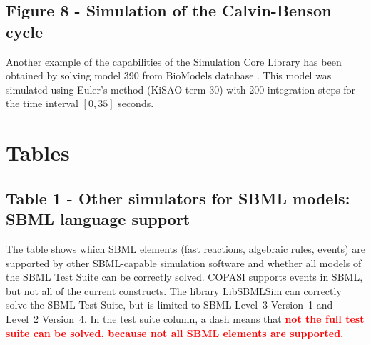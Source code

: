 \documentclass[10pt]{bmc_article}
\newenvironment{bmcformat}{\baselineskip20pt\sloppy\setboolean{publ}{false}}{\baselineskip20pt\sloppy}
\newcommand{\TODO}[1]{\textcolor{red}{\textbf{#1}}}
\begin{document}
\begin{bmcformat}
\subsection*{Figure 8 - Simulation of the Calvin-Benson cycle}
Another example of the capabilities of the Simulation Core Library has been obtained by solving model 390 from BioModels database \cite{Novere2006a, Arnold2011}.
This model was simulated using Euler's method (KiSAO term 30) with 200 integration steps for the time interval $[0, 35]$ seconds.



\section*{Tables}

\subsection*{Table 1 - Other simulators for SBML models: SBML language support}
The table shows which SBML elements (fast reactions, algebraic rules, events) 
are supported by other SBML-capable simulation software and whether all models
of the SBML Test Suite can be correctly solved.
COPASI supports events in SBML, but not all of the current constructs.
The library LibSBMLSim can correctly solve the SBML Test Suite, but is limited
to SBML Level~3 Version~1 and Level~2 Version~4.
In the test suite column, a dash means that
\TODO{not the full test suite can be solved, because not all SBML elements are supported.}


\end{bmcformat}
\end{document}
